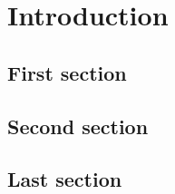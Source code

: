
\chapter{Introduction} \lipsum[1]
\section{First section} \lipsum[2-3]
\section{Second section} \lipsum[4-5]
\section{Last section} \lipsum[6-7]
